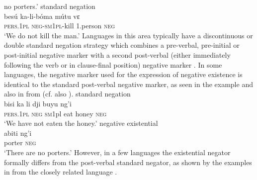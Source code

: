 \documentclass[output=paper]{langscibook}
\begin{document}
no porters.' \ex\label{ex:duma-kill} standard negation
\citep[144]{Mickala1988}\\ \gll bes{\'u} ka-li-b{\'o}ma m{\'u}tu vɛ\\
\textsc{pers.1pl} \textsc{neg-sm1pl}-kill 1.person \textsc{neg}\\ \glt 	`We
do not kill the man.' \z\z 
%
Languages in this area typically have a
discontinuous or double standard negation strategy which combines a
pre-verbal, pre-initial or post-initial negative marker with a second
post-verbal (either immediately following the verb or in clause-final
position) negative marker \citep{DevosAuwera2013}. In some languages, the
negative marker used for the expression of negative existence is identical
to the standard post-verbal negative marker, as seen in the 
example  and also in
 from  (cf. also
).  \ea\label{ex:nduumo-honey-porter}
 \ea standard
negation\\ \gll bisi ka li dji buyu ng'i\\ \textsc{pers.1pl} \textsc{neg}
\textsc{sm1}pl eat honey \textsc{neg}\\ \glt `We have not eaten the honey.'
\ex negative existential\\ \gll abiti ng'i\\ porter \textsc{neg}\\ \glt
`There are no porters.' \z\z However, in a few languages the existential
negator formally differs from the post-verbal standard negator, as shown by
the examples in  from the closely related
language .
\end{document}
